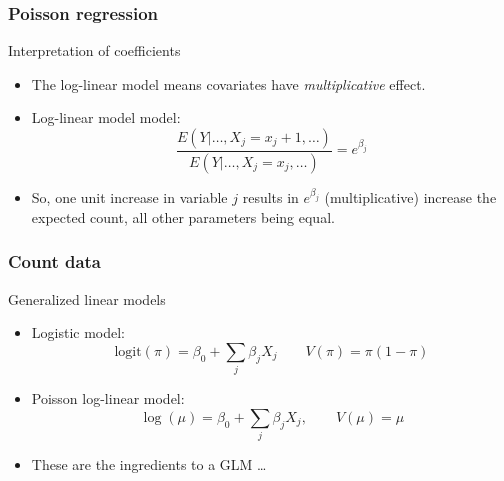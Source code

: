 \documentclass[handout]{beamer}
\newcommand{\logit}{\text{logit}}
\begin{document}

   \begin{frame} \frametitle{Poisson regression}

   \begin{block}
   {Interpretation of coefficients}

   \begin{itemize}
   \item   The log-linear model
   means covariates have {\em multiplicative} effect.

   \item Log-linear model model:
   $$
   \frac{E(Y|\dots, X_j=x_j+1, \dots)}{E(Y|\dots, X_j=x_j, \dots)} = e^{\beta_j}
   $$


   \item So, one unit increase in variable $j$ results in $e^{\beta_j}$
   (multiplicative) increase the expected count, all other parameters being equal.

   \end{itemize}
   \end{block}
   \end{frame}


   \begin{frame} \frametitle{Count data}

   \begin{block}
         {Generalized linear models}
         \begin{itemize}
         \item Logistic model:
   $$ \logit(\pi) = \beta_0 + \sum_j \beta_j X_j \qquad V(\pi)=\pi(1-\pi)$$

   \item Poisson log-linear model:
   $$
   \log(\mu) = \beta_0 + \sum_j \beta_j X_j, \qquad V(\mu) = \mu$$

   \item These are the ingredients to a GLM \dots
         \end{itemize}
   \end{block}
   \end{frame}

\end{document}

